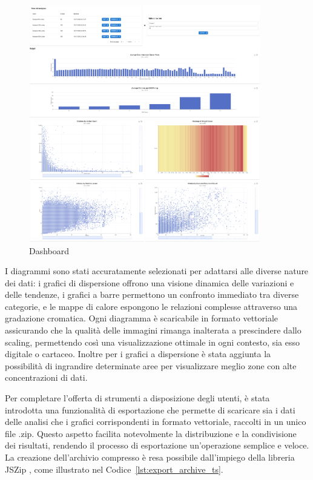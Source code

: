 \begin{figure}[ht]
    \centering
    \includegraphics[width=0.9\textwidth]{images/dashboard.png}
    \caption{Dashboard}
    \label{fig:dashboard}
\end{figure}


I diagrammi sono stati accuratamente selezionati per adattarsi alle diverse nature dei dati: i grafici di dispersione offrono una visione dinamica delle variazioni e delle tendenze, i grafici a barre permettono un confronto immediato tra diverse categorie, e le mappe di calore espongono le relazioni complesse attraverso una gradazione cromatica. 
Ogni diagramma è scaricabile in formato vettoriale assicurando che la qualità delle immagini rimanga inalterata a prescindere dallo scaling, permettendo così una visualizzazione ottimale in ogni contesto, sia esso digitale o cartaceo.
Inoltre per i grafici a dispersione è stata aggiunta la possibilità di ingrandire determinate aree per visualizzare meglio zone con alte concentrazioni di dati.

Per completare l'offerta di strumenti a disposizione degli utenti, è stata introdotta una funzionalità di esportazione che permette di scaricare sia i dati delle analisi che i grafici corrispondenti in formato vettoriale, raccolti in un unico file .zip. Questo aspetto facilita notevolmente la distribuzione e la condivisione dei risultati, rendendo il processo di esportazione un'operazione semplice e veloce. La creazione dell'archivio compresso è resa possibile dall'impiego della libreria JSZip \cite{jszip}, come illustrato nel Codice~\ref{lst:export_archive_ts}.

